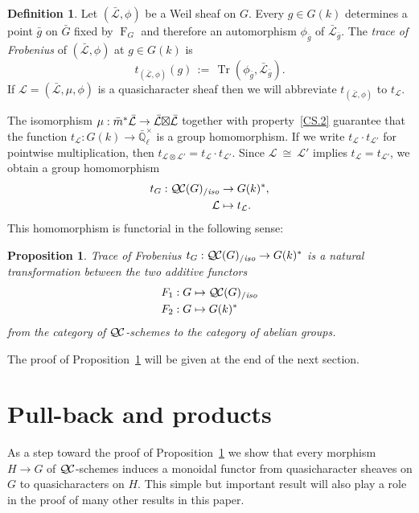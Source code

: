 \documentclass[11pt]{amsart}
\theoremstyle{plain}
\newtheorem{proposition}[theorem]{Proposition}
\theoremstyle{definition}
\newtheorem{definition}[theorem]{Definition}
\theoremstyle{remark}
\newcommand{\EE}{\mathbb{\bar Q}_\ell}
\newcommand{\Fq}{k}
\newcommand{\EEx}{\EE^\times}
\newcommand{\Frob}[1]{\operatorname{F}_{#1}}
\DeclareMathOperator{\trace}{Tr}
\newcommand{\cdef}[1]{ {#1}\index{#1} }
\newcommand{\ceq}{{\, :=\, }}
\newcommand{\iso}{{\ \cong\ }}
\newcommand{\qcs}[1]{{\mathcal{#1}}}
\newcommand{\gqcs}[1]{{\mathcal{\bar #1}}}
\newcommand{\QC}{{\mathcal{Q\hskip-0.8pt C}}}
\newcommand{\QCiso}[1]{\QC(#1)_{/\textit{iso}}}
\newcommand{\trFrob}[1]{t_{#1}}
\newcommand{\bg}{\bar{g}}
\newcommand{\bm}{\bar{m}}
\newcommand{\bG}{\bar{G}}
\newcommand{\tight}[3]{\hspace{-#1pt}{#2}\hspace{-#3pt}}
\newcommand{\LxL}{\text{$\gqcs{L} \tight{0}{\boxtimes}{0} \gqcs{L}$}}
\begin{document}
\begin{definition}\label{def:trFrob}
Let $(\gqcs{L},\phi)$ be a Weil sheaf on $G$. Every $g\in G(\Fq)$
determines a point $\bg$ on $\bG$ fixed by $\Frob{G}$ and
therefore an automorphism $\phi_{\bg}$ of $\gqcs{L}_{\bg}$. The \emph{trace of Frobenius} of $(\gqcs{L},\phi)$ at $g\in G(\Fq)$ is 
\[
\trFrob{(\gqcs{L},\phi)}(g) \ceq \trace(\phi_{\bg}, \gqcs{L}_{\bg}).
\]
If $\qcs{L} = (\gqcs{L},\mu,\phi)$ is a quasicharacter sheaf
then we will abbreviate $\trFrob{(\gqcs{L},\phi)}$ to $\trFrob{\qcs{L}}$.
\end{definition}

The isomorphism $\mu : \bm^* \gqcs{L} \to \LxL$ together with property~\ref{CS.2} guarantee
that the function $\trFrob{\qcs{L}} : G(\Fq)\to \EEx$ is a group homomorphism.  If we write
$\trFrob{\qcs{L}} \cdot \trFrob{\qcs{L'}}$ for pointwise multiplication, then 
 $\trFrob{\qcs{L}\otimes \qcs{L'}} = \trFrob{\qcs{L}} \cdot \trFrob{\qcs{L'}}$.
Since $\qcs{L} \iso \qcs{L'}$ implies $\trFrob{\qcs{L}} = \trFrob{\qcs{L'}}$,
we obtain a group homomorphism
\begin{align*}
\cdef{\trFrob{G}} : \QCiso{G} &\to G(\Fq)^*, \\
\qcs{L} &\mapsto \trFrob{\qcs{L}}.
\end{align*}
This homomorphism is functorial in the following sense:

\begin{proposition}\label{prop:functorialG}
Trace of Frobenius $\trFrob{G} : \QCiso{G} \to G(\Fq)^*$ is a natural transformation 
between the two additive functors 
\begin{align*}
F_1 : G &\mapsto \QCiso{G} \\
F_2 : G &\mapsto G(\Fq)^*
\end{align*}
from the category of $\QC$-schemes to the category of abelian groups.
\end{proposition}

The proof of Proposition~\ref{prop:functorialG} will be given at the end of the next section.

\section{Pull-back and products}\label{sec:pullback}

As a step toward the proof of Proposition~\ref{prop:functorialG} we show that every
morphism  $H \to G$ of $\QC$-schemes induces a monoidal functor from quasicharacter
sheaves on $G$ to quasicharacters on $H$. This simple but important result will also
play a role in the proof of many other results in this paper.
\end{document}
